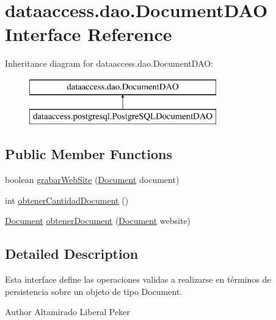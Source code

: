 \hypertarget{interfacedataaccess_1_1dao_1_1_document_d_a_o}{\section{dataaccess.\-dao.\-Document\-D\-A\-O \-Interface \-Reference}
\label{interfacedataaccess_1_1dao_1_1_document_d_a_o}
}
\-Inheritance diagram for dataaccess.\-dao.\-Document\-D\-A\-O\-:\begin{figure}[H]
\begin{center}
\leavevmode
\includegraphics[height=2.000000cm]{interfacedataaccess_1_1dao_1_1_document_d_a_o}
\end{center}
\end{figure}
\subsection*{\-Public \-Member \-Functions}
\begin{DoxyCompactItemize}
\item 
boolean \hyperlink{interfacedataaccess_1_1dao_1_1_document_d_a_o_a94556d61af10d151eec677720d5799c3}{grabar\-Web\-Site} (\hyperlink{classcom_1_1utn_1_1searchengine_1_1_document}{\-Document} document)
\item 
int \hyperlink{interfacedataaccess_1_1dao_1_1_document_d_a_o_affbba9edb72e5b871bbd08c9cae25655}{obtener\-Cantidad\-Document} ()
\item 
\hyperlink{classcom_1_1utn_1_1searchengine_1_1_document}{\-Document} \hyperlink{interfacedataaccess_1_1dao_1_1_document_d_a_o_a846058ac889a57d4d26eeb9f45f9daac}{obtener\-Document} (\hyperlink{classcom_1_1utn_1_1searchengine_1_1_document}{\-Document} website)
\end{DoxyCompactItemize}


\subsection{\-Detailed \-Description}
\-Esta interface define las operaciones validas a realizarse en términos de persistencia sobre un objeto de tipo \-Document.

\begin{DoxyAuthor}{\-Author}
\-Altamirado \-Liberal \-Peker 
\end{DoxyAuthor}


